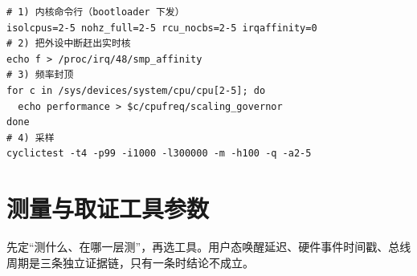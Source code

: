 \documentclass[12pt,a4paper,fontset=fandol]{ctexbook}
\begin{document}
\begin{lstlisting}[style=shellstyle,caption={隔离实时核并采样一轮的典型命令},label={lst:apB-linux-deploy}]
# 1) 内核命令行（bootloader 下发）
isolcpus=2-5 nohz_full=2-5 rcu_nocbs=2-5 irqaffinity=0
# 2) 把外设中断赶出实时核
echo f > /proc/irq/48/smp_affinity
# 3) 频率封顶
for c in /sys/devices/system/cpu/cpu[2-5]; do
  echo performance > $c/cpufreq/scaling_governor
done
# 4) 采样
cyclictest -t4 -p99 -i1000 -l300000 -m -h100 -q -a2-5
\end{lstlisting}

\section{测量与取证工具参数}

先定``测什么、在哪一层测''，再选工具。用户态唤醒延迟、硬件事件时间戳、总线周期是三条独立证据链，只有一条时结论不成立。
\end{document}
